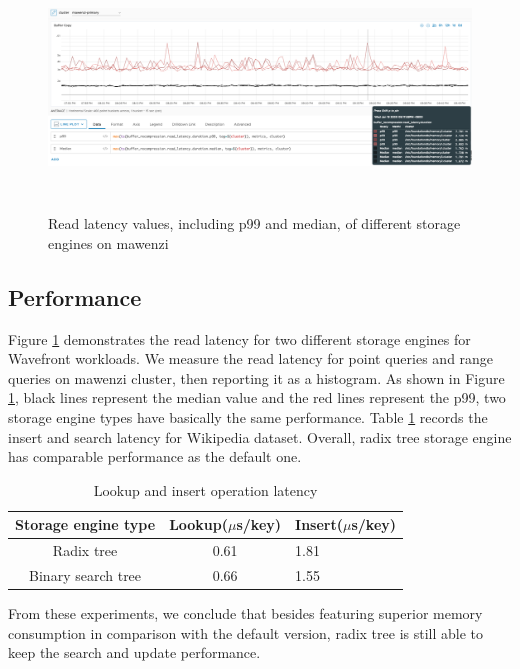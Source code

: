 \documentclass[sigplan,screen,nonacm]{acmart}
\begin{document}
\begin{figure}[t]
  \centering
  \includegraphics[width=\linewidth, height=6.5cm]{pic/read latency.png}
  \setlength{\belowcaptionskip}{-8pt} 
  \caption{Read latency values, including p99 and median, of different storage engines on mawenzi}
  \label{fig:read-latency}
\end{figure}

\subsection{Performance}
Figure \ref{fig:read-latency} demonstrates the read latency for two different storage engines for Wavefront workloads. We measure the read latency for point queries and range queries on mawenzi cluster, then reporting it as a histogram. As shown in Figure \ref{fig:read-latency}, black lines represent the median value and the red lines represent the p99, two storage engine types have basically the same performance. Table \ref{tab:wiki-latency} records the insert and search latency for Wikipedia dataset. Overall, radix tree storage engine has comparable performance as the default one. 

\begin{table}[h]
  \caption{Lookup and insert operation latency}
  \begin{tabular}{ccl}
    \toprule
    Storage engine type&Lookup($\mu$s/key)&Insert($\mu$s/key)\\
    \midrule
    Radix tree & 0.61 & 1.81\\
    Binary search tree & 0.66 & 1.55\\
    \bottomrule
  \end{tabular}
  \label{tab:wiki-latency}
\end{table}

From these experiments, we conclude that besides featuring superior memory consumption in comparison with the default version, radix tree is still able to keep the search and update performance. 
\end{document}

